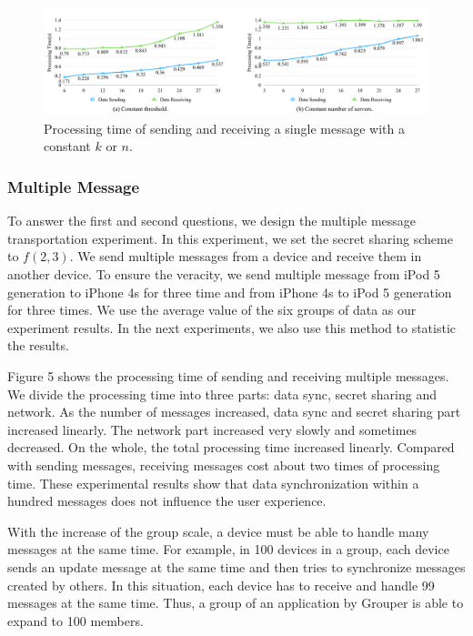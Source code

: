 \documentclass[twocolumn,10pt]{article}
\begin{document}
\begin{figure}[t]
	\centering
	\includegraphics[scale=0.13]{constant_k_n}
	\caption{Processing time of sending and receiving a single message with a constant ${k}$ or ${n}$.}
\end{figure}

\subsubsection{Multiple Message}

To answer the first and second questions, we design the multiple message transportation experiment.
In this experiment, we set the secret sharing scheme to ${f(2, 3)}$.
We send multiple messages from a device and receive them in another device. 
To ensure the veracity, we send multiple message from iPod 5 generation to iPhone 4s for three time and from iPhone 4s to iPod 5 generation for three times.
We use the average value of the six groups of data as our experiment results.
In the next experiments, we also use this method to statistic the results.

Figure 5 shows the processing time of sending and receiving multiple messages.
We divide the processing time into three parts: data sync, secret sharing and network.
As the number of messages increased, data sync and secret sharing part increased linearly. 
The network part increased very slowly and sometimes decreased.
On the whole, the total processing time increased linearly.
Compared with sending messages, receiving messages cost about two times of processing time.
These experimental results show that data synchronization within a hundred messages does not influence the user experience.

With the increase of the group scale, a device must be able to handle many messages at the same time.
For example, in 100 devices in a group, each device sends an update message at the same time and then tries to synchronize messages created by others.
In this situation, each device has to receive and handle 99 messages at the same time.
Thus, a group of an application by Grouper is able to expand to 100 members.
\end{document}
